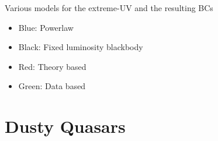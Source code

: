 \documentclass[landscape,9pt]{beamer}
\begin{document}
\begin{frame}
\begin{columns}
\begin{column}{0.6\textwidth}
		\end{column}
	\end{columns}
	\vspace{-2mm}
	\begin{block}{Various models for the extreme-UV and the resulting BCs}
		\begin{itemize}
			\item Blue: Powerlaw
			\item Black: Fixed luminosity blackbody
			\item Red: Theory based \citep[from CLOUDY;][]{Casebeer:2006}
			\item Green: Data based \citep{Scott:2004}					
		\end{itemize}
	\end{block}
	\end{frame}

\section{Dusty Quasars}
\end{document}
